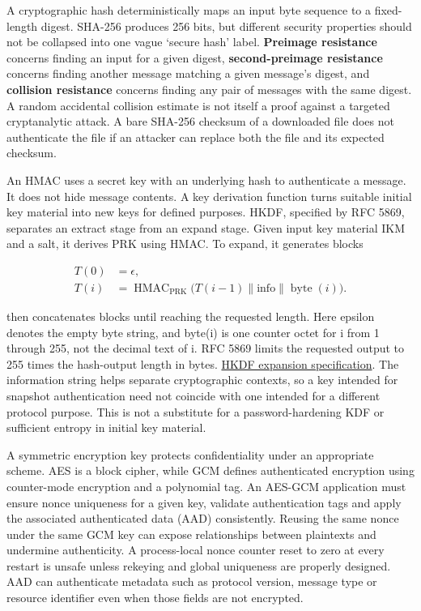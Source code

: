 A cryptographic hash deterministically maps an input byte sequence to a fixed-length digest. SHA-256 produces 256 bits, but different security properties should not be collapsed into one vague `secure hash' label. \textbf{Preimage resistance} concerns finding an input for a given digest, \textbf{second-preimage resistance} concerns finding another message matching a given message's digest, and \textbf{collision resistance} concerns finding any pair of messages with the same digest. A random accidental collision estimate is not itself a proof against a targeted cryptanalytic attack. A bare SHA-256 checksum of a downloaded file does not authenticate the file if an attacker can replace both the file and its expected checksum.

An HMAC uses a secret key with an underlying hash to authenticate a message. It does not hide message contents. A key derivation function turns suitable initial key material into new keys for defined purposes. HKDF, specified by RFC 5869, separates an extract stage from an expand stage. Given input key material IKM and a salt, it derives PRK using HMAC. To expand, it generates blocks

\[
\begin{aligned}
T(0)&=\epsilon,\\
T(i)&=\operatorname{HMAC}_{\mathrm{PRK}}
\bigl(T(i-1)\parallel\mathrm{info}\parallel\operatorname{byte}(i)\bigr).
\end{aligned}
\]

then concatenates blocks until reaching the requested length. Here epsilon denotes the empty byte string, and byte(i) is one counter octet for i from 1 through 255, not the decimal text of i. RFC 5869 limits the requested output to 255 times the hash-output length in bytes. \href{https://www.rfc-editor.org/rfc/rfc5869.html\#section-2.3}{HKDF expansion specification}. The information string helps separate cryptographic contexts, so a key intended for snapshot authentication need not coincide with one intended for a different protocol purpose. This is not a substitute for a password-hardening KDF or sufficient entropy in initial key material.

A symmetric encryption key protects confidentiality under an appropriate scheme. AES is a block cipher, while GCM defines authenticated encryption using counter-mode encryption and a polynomial tag. An AES-GCM application must ensure nonce uniqueness for a given key, validate authentication tags and apply the associated authenticated data (AAD) consistently. Reusing the same nonce under the same GCM key can expose relationships between plaintexts and undermine authenticity. A process-local nonce counter reset to zero at every restart is unsafe unless rekeying and global uniqueness are properly designed. AAD can authenticate metadata such as protocol version, message type or resource identifier even when those fields are not encrypted.

